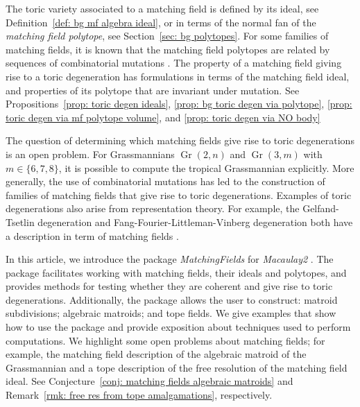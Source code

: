 \documentclass[11pt]{article}
\DeclareMathOperator{\Gr}{Gr}
\theoremstyle{plain}
\theoremstyle{definition}
\theoremstyle{remark}
\begin{document}
The toric variety associated to a matching field is defined by its ideal,
see Definition~\ref{def: bg mf algebra ideal}, or in terms of the normal fan of the \textit{matching field polytope}, 
see Section~\ref{sec: bg polytopes}. For some families of matching fields, it is known that the matching field polytopes are related by sequences of combinatorial mutations \cite{clarke2021combinatorial, clarke2022combinatorial, clarke2022partial}. The property of a matching field giving rise to a toric degeneration has formulations in terms of the matching field ideal, and properties of its polytope that are invariant under mutation. See Propositions~\ref{prop: toric degen ideals}, \ref{prop: bg toric degen via polytope}, \ref{prop: toric degen via mf polytope volume}, and \ref{prop: toric degen via NO body}


The question of determining which matching fields give rise to toric degenerations is an open problem. For Grassmannians $\Gr(2,n)$ and $\Gr(3,m)$ with $m \in \{6,7,8\}$, it is possible to compute the tropical Grassmannian explicitly. More generally, the use of combinatorial mutations has led to the construction of families of matching fields that give rise to toric degenerations. Examples of toric degenerations also arise from representation theory. For example, the Gelfand-Tsetlin degeneration and Fang-Fourier-Littleman-Vinberg degeneration both have a description in term of matching fields \cite{clarke2022combinatorial}.


In this article, we introduce the package \textit{MatchingFields} for \textit{Macaulay2} \cite{M2}. The package facilitates working with matching fields, their ideals and polytopes, and provides methods for testing whether they are coherent and give rise to toric degenerations. Additionally, the package allows the user to construct: matroid subdivisions; algebraic matroids; and tope fields. We give examples that show how to use the package and provide exposition about techniques used to perform computations. We highlight some open problems about matching fields; for example, the matching field description of the algebraic matroid of the Grassmannian and a tope description of the free resolution of the matching field ideal. See Conjecture~\ref{conj: matching fields algebraic matroids} and Remark~\ref{rmk: free res from tope amalgamations}, respectively.
\end{document}
